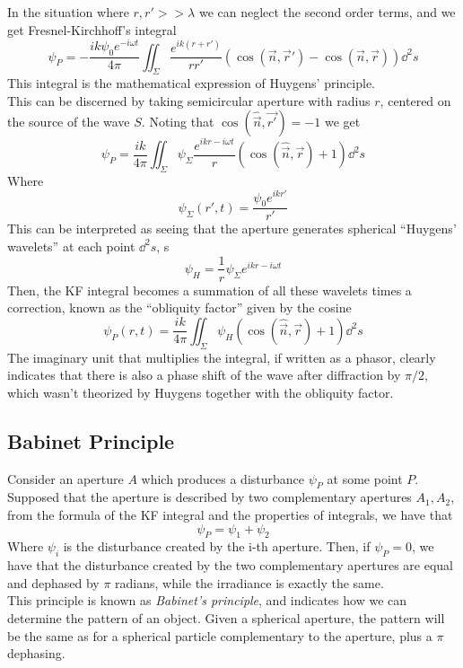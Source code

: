 \documentclass[../electromagnetism.tex]{subfiles}
\begin{document}
In the situation where $r, r'>>\lambda$ we can neglect the second order terms, and we get Fresnel-Kirchhoff's integral
\begin{equation}
	\psi_P=-\frac{ik\psi_0e^{-i\omega t}}{4\pi}\iint_\Sigma\frac{e^{ik(r+r')}}{rr'}\left( \cos(\vec{n},\vec{r}')-\cos(\vec{n},\vec{r}) \right)\dd^2s
	\label{eq:fresnelkirchhoff.diff}
\end{equation}
This integral is the mathematical expression of Huygens' principle.\\
This can be discerned by taking semicircular aperture with radius $r$, centered on the source of the wave $S$. Noting that $\cos(\hat{\vec{n}},\vec{r'})=-1$ we get 
\begin{equation*}
	\psi_P=\frac{ik}{4\pi}\iint_\Sigma\psi_\Sigma\frac{e^{ikr-i\omega t}}{r}\left( \cos(\hat{\vec{n}},\vec{r})+1 \right)\dd^2s
\end{equation*}
Where
\begin{equation*}
	\psi_\Sigma(r', t)=\frac{\psi_0e^{ikr'}}{r'}
\end{equation*}
This can be interpreted as seeing that the aperture generates spherical ``Huygens' wavelets'' at each point $\dd^2s$, s
\begin{equation*}
	\psi_H=\frac{1}{r}\psi_\Sigma e^{ikr-i\omega t}
\end{equation*}
Then, the KF integral becomes a summation of all these wavelets times a correction, known as the ``obliquity factor'' given by the cosine
\begin{equation}
	\psi_P(r, t)=\frac{ik}{4\pi}\iint_\Sigma\psi_H\left( \cos(\hat{\vec{n}},\vec{r})+1 \right)\dd^2s
	\label{eq:huygensprinciple.diff}
\end{equation}
The imaginary unit that multiplies the integral, if written as a phasor, clearly indicates that there is also a phase shift of the wave after diffraction by $\pi/2$, which wasn't theorized by Huygens together with the obliquity factor.
\subsection{Babinet Principle}
Consider an aperture $A$ which produces a disturbance $\psi_P$ at some point $P$. Supposed that the aperture is described by two complementary apertures $A_1, A_2$, from the formula of the KF integral and the properties of integrals, we have that 
\begin{equation*}
	\psi_P=\psi_1+\psi_2
\end{equation*}
Where $\psi_i$ is the disturbance created by the i-th aperture. Then, if $\psi_P=0$, we have that the disturbance created by the two complementary apertures are equal and dephased by $\pi$ radians, while the irradiance is exactly the same.\\
This principle is known as \textit{Babinet's principle}, and indicates how we can determine the pattern of an object. Given a spherical aperture, the pattern will be the same as for a spherical particle complementary to the aperture, plus a $\pi$ dephasing.
\end{document}
